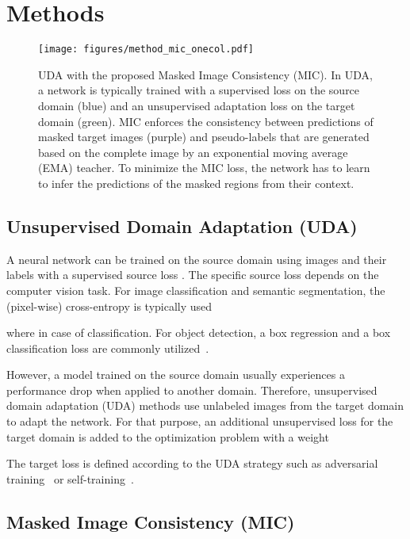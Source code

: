 \documentclass[10pt,twocolumn,letterpaper]{article}
\begin{document}
\section{Methods}
\label{sec:methods}

\begin{figure}
    \centering
    \texttt{[image: figures/method\_mic\_onecol.pdf]}
    \caption{UDA with the proposed Masked Image Consistency (MIC). In UDA, a network is typically trained with a supervised loss on the source domain (blue) and an unsupervised adaptation loss on the target domain (green). MIC enforces the consistency between predictions of masked target images (purple) and pseudo-labels that are generated based on the complete image by an exponential moving average (EMA) teacher. To minimize the MIC loss, the network has to learn to infer the predictions of the masked regions from their context. 
    }
    \label{fig:method}
\end{figure}

\subsection{Unsupervised Domain Adaptation (UDA)}

A neural network  can be trained on the source domain using images  and their labels  with a supervised source loss . The specific source loss depends on the computer vision task. For image classification and semantic segmentation, the (pixel-wise) cross-entropy is typically used

where  in case of classification. For object detection, a box regression and a box classification loss are commonly utilized~\cite{ren2015faster}.

However, a model trained on the source domain usually experiences a performance drop when applied to another domain. Therefore, unsupervised domain adaptation (UDA) methods use unlabeled images from the target domain  to adapt the network.
For that purpose, an additional unsupervised loss for the target domain  is added to the optimization problem with a weight 


The target loss  is defined according to the UDA strategy such as adversarial training~\cite{ganin2016domain,tsai2018learning,tsai2019domain,wang2020classes, chen2021scale, rangwani2022closer} or self-training~\cite{zou2018unsupervised,zhang2019category,mei2020instance,tranheden2021dacs,zhang2021prototypical,hoyer2021daformer}. 

 \subsection{Masked Image Consistency (MIC)}
\end{document}
